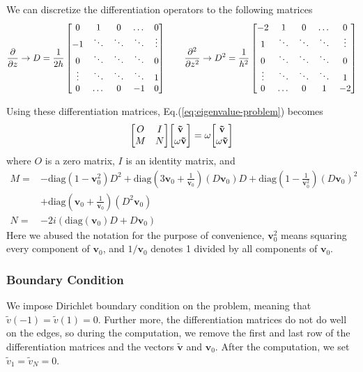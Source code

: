 We can discretize the differentiation operators to the following matrices
\[ 
\pdv{z} \rightarrow D = \frac{1}{2h}\begin{bmatrix}
	0 & 1 & 0 & \dots & 0 \\
	-1 & \ddots & \ddots & \ddots & \vdots \\ 
	0 & \ddots & \ddots & \ddots & 0 \\
	\vdots & \ddots & \ddots & \ddots & 1 \\
	0 & \dots & 0 & -1 & 0 
\end{bmatrix} 
\qquad
\pdv[2]{z} \rightarrow  D^2 = \frac{1}{h^2}\begin{bmatrix}
	-2 & 1 & 0 & \dots & 0 \\
	1 & \ddots & \ddots & \ddots & \vdots \\ 
	0 & \ddots & \ddots & \ddots & 0 \\
	\vdots & \ddots & \ddots & \ddots & 1 \\
	0 & \dots & 0 & 1 & -2 
\end{bmatrix} 
\]

Using these differentiation matrices, Eq.(\ref{eq:eigenvalue-problem}) becomes
\begin{equation}
	\mqty[ O & I\\ M & N ]\mqty[ \mathbf{\tilde{v}}\\ \omega\mathbf{\tilde{v}} ] = \omega\mqty[ \mathbf{\tilde{v}}\\ \omega\mathbf{\tilde{v}} ]
\end{equation}
where $O$ is a zero matrix, $I$ is an identity matrix, and
\begin{align*}
	M =& -\text{diag}(1-\mathbf{v}_0^2)D^2 
	+\text{diag}\left(3\mathbf{v}_0 + \frac{1}{\mathbf{v}_0}\right) (D\mathbf{v}_0)D 
	+\text{diag}\left(1-\frac{1}{\mathbf{v}_0^2}\right)\left(D\mathbf{v}_0\right)^2 \\
	&+\text{diag}\left(\mathbf{v}_0+\frac{1}{\mathbf{v}_0}\right)(D^2\mathbf{v}_0) \\
	N =& -2i\left(\text{diag}(\mathbf{v}_0)D + D\mathbf{v}_0 \right) 
\end{align*}
Here we abused the notation for the purpose of convenience, $\mathbf{v}_0^2$ means squaring every component of $\mathbf{v}_0$, and $1/\mathbf{v}_0$ denotes 1 divided by all components of $\mathbf{v}_0$.

\subsubsection{Boundary Condition}
We impose Dirichlet boundary condition on the problem, meaning that $\tilde{v}(-1)=\tilde{v}(1)=0$. Further more, the differentiation matrices do not do well on the edges, so during the computation, we remove the first and last row of the differentiation matrices and the vectors $\mathbf{\tilde{v}}$ and $\mathbf{v}_0$. After the computation, we set $\tilde{v}_1=\tilde{v}_N = 0$.

